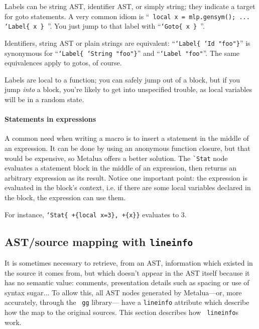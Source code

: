 Labels can be string AST, identifier AST, or simply string; they
indicate a target for goto statements.  A very common idiom is ``{\tt
  local x = mlp.gensym(); ... `Label\{ x \} }''. You just jump to that
label with ``{\tt `Goto\{ x \} }''.

Identifiers, string AST or plain strings are equivalent:
``{\tt`Label\{ `Id "foo"\}}'' is synonymous for ``{\tt`Label\{ `String
  "foo"\}}'' and ``{\tt`Label "foo"}''. The same equivalences apply
to gotos, of course.

Labels are local to a function; you can safely jump out of a block,
but if you jump {\em into} a block, you're likely to get into unspecified
trouble, as local variables will be in a random state.

\paragraph{Statements in expressions}
A common need when writing a macro is to insert a statement in the
middle of an expression. It can be done by using an anonymous function
closure, but that would be expensive, so Metalua offers a better
solution. The \verb|`Stat| node evaluates a statement block in the
middle of an expression, then returns an arbitrary expression as its
result. Notice one important point: the expression is evaluated in
the block's context, i.e. if there are some local variables declared
in the block, the expression can use them.

For instance, {\tt `Stat\{ +\{local x=3\}, +\{x\}\}} evaluates to 3.



\subsection{AST/source mapping with {\tt lineinfo}}

It is sometimes necessary to retrieve, from an AST, information which
existed in the source it comes from, but which doesn't appear in the
AST itself because it has no semantic value: comments, presentation
details such as spacing or use of syntax sugar... To allow this, all
AST nodes generated by Metalua---or, more accurately, through the {\tt
gg} library--- have a {\tt lineinfo} attribute which describe how the
map to the original sources. This section describes how {\tt
  lineinfo}s work.

